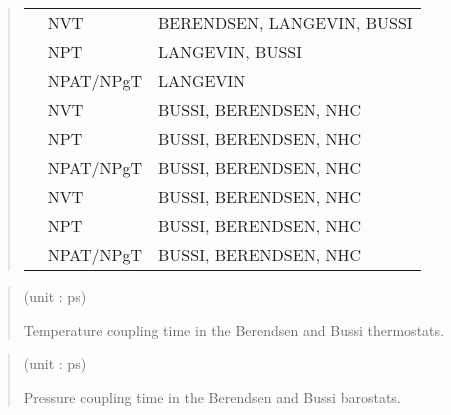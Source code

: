 \documentclass[a4paper,11pt,oneside,english]{sphinxmanual}
\begin{document}
\begin{quote}
\begin{savenotes}
\begin{tabulary}{\linewidth}[t]{|T|T|T|}
{%
}%
&
NVT
&
BERENDSEN, LANGEVIN, BUSSI
\\
&
NPT
&
LANGEVIN, BUSSI
\\
&
NPAT/NPgT
&
LANGEVIN
\\
\hline{}%
&
NVT
&
BUSSI, BERENDSEN, NHC
\\
&
NPT
&
BUSSI, BERENDSEN, NHC
\\
&
NPAT/NPgT
&
BUSSI, BERENDSEN, NHC
\\
\hline{}%
&
NVT
&
BUSSI, BERENDSEN, NHC
\\
&
NPT
&
BUSSI, BERENDSEN, NHC
\\
&
NPAT/NPgT
&
BUSSI, BERENDSEN, NHC
\\
\hline
\end{tabulary}
\par
\sphinxattableend\end{savenotes}
\end{quote}

 
\begin{quote}

 (unit : ps)

Temperature coupling time in the Berendsen and Bussi thermostats.
\end{quote}

 
\begin{quote}

 (unit : ps)

Pressure coupling time in the Berendsen and Bussi barostats.
\end{quote}
\end{document}
